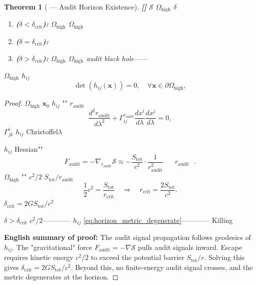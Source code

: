 \documentclass[12pt,a4paper]{article}
\newtheorem{theorem}{Theorem}[section]
\theoremstyle{remark}
\newcommand{\x}{\mathbf{x}}
\newcommand{\rigorFull}{\textnormal{\textbf{[]}}}
\newcommand{\cG}{G}          %
\newcommand{\cC}{c}          %
\begin{document}
\begin{theorem}[ — Audit Horizon Existence]\label{thm:audit_horizon_existence}\rigorFull
 $\mathcal{S}$  $\Omega_{\mathrm{high}}$ $\delta$
\begin{enumerate}[label=(\roman*)]
    \item \textbf{($\delta < \delta_{\mathrm{crit}}$):} $\Omega_{\mathrm{high}}$  $\Omega_{\mathrm{high}}$ 
    \item \textbf{($\delta = \delta_{\mathrm{crit}}$):} 
    \item \textbf{($\delta > \delta_{\mathrm{crit}}$):} $\Omega_{\mathrm{high}}$ $\Omega_{\mathrm{high}}$ \textbf{}audit black hole——
\end{enumerate}
 $\Omega_{\mathrm{high}}$  $h_{ij}$ 
\begin{equation}
    \det\left(h_{ij}(\x)\right) = 0, \quad \forall \x \in \partial\Omega_{\mathrm{high}},
    \label{eq:horizon_metric_degenerate}
\end{equation}

\end{theorem}

\begin{proof}
 $\Omega_{\mathrm{high}}$  $\x_0$  $h_{ij}$ "" $r_{\mathrm{audit}}$ 
\begin{equation}
    \frac{d^2 r_{\mathrm{audit}}}{d\lambda^2} + \Gamma^{r_{\mathrm{audit}}}_{ij} \frac{dx^i}{d\lambda}\frac{dx^j}{d\lambda} = 0,
\end{equation}
 $\Gamma^{i}_{jk}$  $h_{ij}$ Christoffel$\lambda$ 

$h_{ij}$ Hessian""
\begin{equation}
    F_{\mathrm{audit}} = -\nabla_{r_{\mathrm{audit}}} \mathcal{S} \approx -\frac{S_{\mathrm{tot}}}{\cC^2} \cdot \frac{1}{r_{\mathrm{audit}}^2} \quad \text{ } r_{\mathrm{audit}} \text{ }.
\end{equation}
 $\Omega_{\mathrm{high}}$ "" $\cC^2/2$  $S_{\mathrm{tot}}/r_{\mathrm{audit}}$
\begin{equation}
    \frac{1}{2}\cC^2 = \frac{S_{\mathrm{tot}}}{r_{\mathrm{crit}}} \quad \Longrightarrow \quad r_{\mathrm{crit}} = \frac{2S_{\mathrm{tot}}}{\cC^2}.
\end{equation}
$\delta_{\mathrm{crit}} = 2\cG S_{\mathrm{tot}} / \cC^2$

 $\delta > \delta_{\mathrm{crit}}$  $\cC^2/2$———— $h_{ij}$ \ref{eq:horizon_metric_degenerate}———— Killing 

\textbf{English summary of proof:} The audit signal propagation follows geodesics of $h_{ij}$. The "gravitational" force $F_{\mathrm{audit}} = -\nabla\mathcal{S}$ pulls audit signals inward. Escape requires kinetic energy $\cC^2/2$ to exceed the potential barrier $S_{\mathrm{tot}}/r$. Solving this gives $\delta_{\mathrm{crit}} = 2\cG S_{\mathrm{tot}}/\cC^2$. Beyond this, no finite-energy audit signal crosses, and the metric degenerates at the horizon.
\end{proof}
\end{document}
